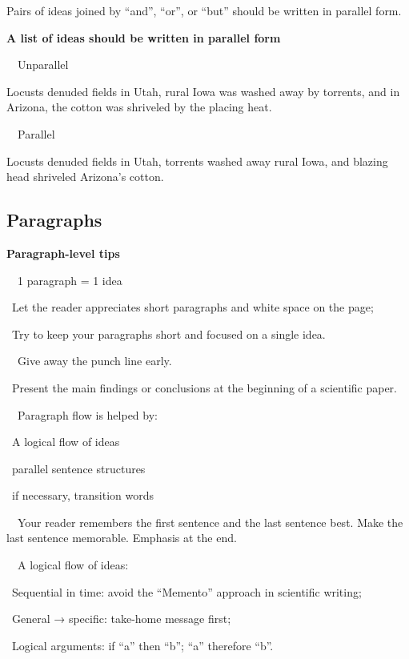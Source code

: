 \documentclass[a4paper, 12pt]{article}
\begin{document}
Pairs of ideas joined by ``and'', ``or'', or ``but'' should be written in parallel form.

\textbf{A list of ideas should be written in parallel form}
\par\ \textbullet\ Unparallel
\par Locusts denuded fields in Utah, rural Iowa was washed away by torrents, and in Arizona, the cotton was shriveled by the placing heat.

\par\ \textbullet\ Parallel
\par Locusts denuded fields in Utah, torrents washed away rural Iowa, and blazing head shriveled Arizona's cotton.

\newpage\subsection{Paragraphs}

\textbf{Paragraph-level tips}

\par\ \textbullet\ 1 paragraph = 1 idea
\par\quad\textopenbullet\ Let the reader appreciates short paragraphs and white space on the page;
\par\quad\textopenbullet\ Try to keep your paragraphs short and focused on a single idea.

\par\ \textbullet\ Give away the punch line early.
\par\quad\textopenbullet\ Present the main findings or conclusions at the beginning of a scientific paper.

\par\ \textbullet\ Paragraph flow is helped by:
\par\quad\textopenbullet\ A logical flow of ideas
\par\quad\textopenbullet\ parallel sentence structures
\par\quad\textopenbullet\ if necessary, transition words

\par\ \textbullet\ Your reader remembers the first sentence and the last sentence best. Make the last sentence memorable. Emphasis at the end.

\par\ \textbullet\ A logical flow of ideas:
\par\quad\textopenbullet\ Sequential in time: avoid the ``Memento'' approach in scientific writing;
\par\quad\textopenbullet\ General → specific: take-home message first;
\par\quad\textopenbullet\ Logical arguments: if ``a'' then ``b''; ``a'' therefore ``b''.
\end{document}
